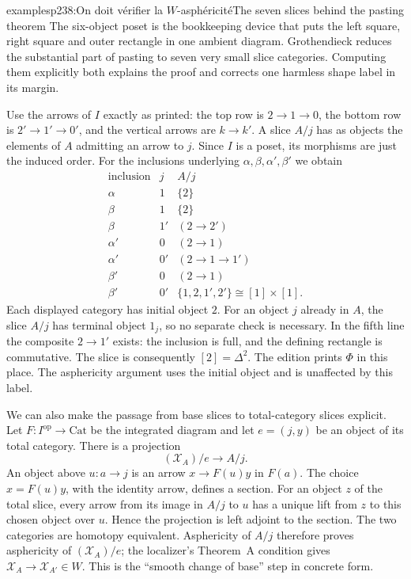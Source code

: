 \begin{dcomment}{examples}{p238:On doit vérifier la $W$-asphéricité}{The seven slices behind the pasting theorem}
The six-object poset is the bookkeeping device that puts the left square, right square and outer rectangle in one ambient diagram. Grothendieck reduces the substantial part of pasting to seven very small slice categories. Computing them explicitly both explains the proof and corrects one harmless shape label in its margin.

Use the arrows of $I$ exactly as printed: the top row is $2\to1\to0$, the bottom row is $2'\to1'\to0'$, and the vertical arrows are $k\to k'$. A slice $A/j$ has as objects the elements of $A$ admitting an arrow to $j$. Since $I$ is a poset, its morphisms are just the induced order. For the inclusions underlying $\alpha,\beta,\alpha',\beta'$ we obtain
\[
\begin{array}{c|c|l}
 \text{inclusion}&j&A/j\\ \hline
 \alpha&1&\{2\}\\
 \beta&1&\{2\}\\
 \beta&1'&(2\longrightarrow2')\\
 \alpha'&0&(2\longrightarrow1)\\
 \alpha'&0'&(2\longrightarrow1\longrightarrow1')\\
 \beta'&0&(2\longrightarrow1)\\
 \beta'&0'&\{1,2,1',2'\}\cong[1]\times[1].
\end{array}
\]
Each displayed category has initial object $2$. For an object $j$ already in $A$, the slice $A/j$ has terminal object $1_j$, so no separate check is necessary. In the fifth line the composite $2\to1'$ exists: the inclusion is full, and the defining rectangle is commutative. The slice is consequently $[2]=\Delta^2$. The edition prints $\Phi$ in this place. The asphericity argument uses the initial object and is unaffected by this label.

We can also make the passage from base slices to total-category slices explicit. Let $F:I^{\mathrm{op}}\to\mathrm{Cat}$ be the integrated diagram and let $e=(j,y)$ be an object of its total category. There is a projection
\[
 (\mathcal X_A)/e\longrightarrow A/j.
\]
An object above $u:a\to j$ is an arrow $x\to F(u)y$ in $F(a)$. The choice $x=F(u)y$, with the identity arrow, defines a section. For an object $z$ of the total slice, every arrow from its image in $A/j$ to $u$ has a unique lift from $z$ to this chosen object over $u$. Hence the projection is left adjoint to the section. The two categories are homotopy equivalent. Asphericity of $A/j$ therefore proves asphericity of $(\mathcal X_A)/e$; the localizer's Theorem~A condition gives $\mathcal X_A\to\mathcal X_{A'}\in W$. This is the ``smooth change of base'' step in concrete form.


\end{dcomment}
